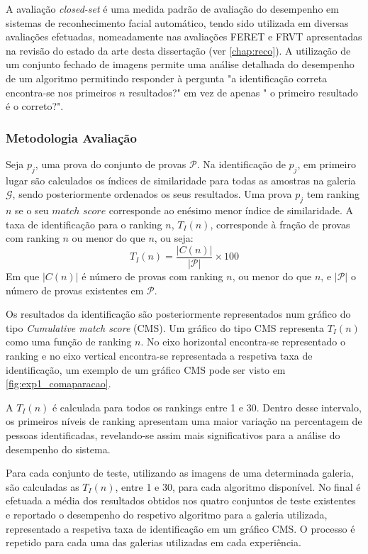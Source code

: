 A avaliação \textit{closed-set} é uma medida padrão de avaliação do desempenho em sistemas de reconhecimento facial automático, tendo sido utilizada em diversas avaliações efetuadas, nomeadamente nas avaliações FERET e FRVT apresentadas na revisão do estado da arte desta dissertação (ver \ref{chap:reco}). A utilização de um conjunto fechado de imagens permite uma análise detalhada do desempenho de um algoritmo permitindo responder à pergunta "a identificação correta encontra-se nos primeiros $n$ resultados?" em vez de apenas " o primeiro resultado é o correto?".

\subsubsection{Metodologia Avaliação}
Seja $p_j$, uma prova do conjunto de provas $\mathscr{P}$. Na identificação de $p_j$, em primeiro lugar são calculados os índices de similaridade para todas as amostras na galeria $\mathscr{G}$, sendo posteriormente ordenados os seus resultados. Uma prova $p_j$ tem ranking $n$ se o seu $match$ $score$ corresponde ao enésimo menor índice de similaridade. A taxa de identificação para o ranking $n$, $T_{I}(n)$, corresponde à fração de provas com ranking $n$ ou menor do que $n$, ou seja:
\begin{equation}
T_{I}(n) = \frac{|C(n)|}{|\mathscr{P}|} \times 100
\end{equation}
Em que $|C(n)|$ é número de provas com ranking $n$, ou menor do que $n$, e $|\mathscr{P}|$ o número de provas existentes em $\mathscr{P}$.
 
Os resultados da identificação são posteriormente representados num gráfico do tipo \textit{Cumulative match score} (CMS). Um gráfico do tipo CMS representa $T_{I}(n)$ como uma função de ranking $n$. No eixo horizontal encontra-se representado o ranking e no eixo vertical encontra-se representada a respetiva taxa de identificação, um exemplo de um gráfico CMS pode ser visto em \ref{fig:exp1_comaparacao}.

A $T_{I}(n)$ é calculada para todos os rankings entre 1 e 30. Dentro desse intervalo, os primeiros níveis de ranking apresentam uma maior variação na percentagem de pessoas identificadas, revelando-se assim mais significativos para a análise do desempenho do sistema.

Para cada conjunto de teste, utilizando as imagens de uma determinada galeria, são calculadas as $T_{I}(n)$, entre 1 e 30, para cada algoritmo disponível. No final é efetuada a média dos resultados obtidos nos quatro conjuntos de teste existentes e reportado o desempenho do respetivo algoritmo para a galeria utilizada, representado a respetiva taxa de identificação em um gráfico CMS. O processo é repetido para cada uma das galerias utilizadas em cada experiência.

